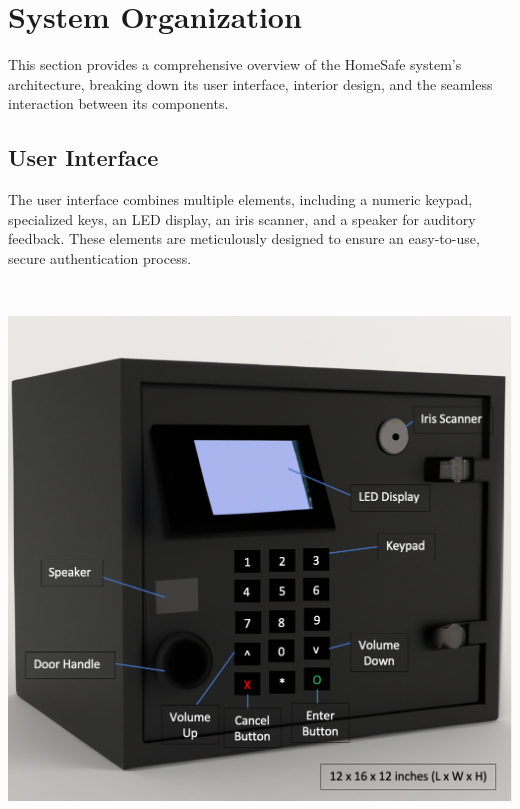 \documentclass{article}
\begin{document}
\section{System Organization}
This section provides a comprehensive overview of the HomeSafe system's architecture, breaking down its user interface, interior design, and the seamless interaction between its components.

\subsection{User Interface}
The user interface combines multiple elements, including a numeric keypad, specialized keys, an LED display, an iris scanner, and a speaker for auditory feedback. These elements are meticulously designed to ensure an easy-to-use, secure authentication process.

\vspace{0.3cm}

\

\begin{center}
\includegraphics[scale=0.55]{docs/figs/closed_safe.png}
\end{center}
\end{document}
